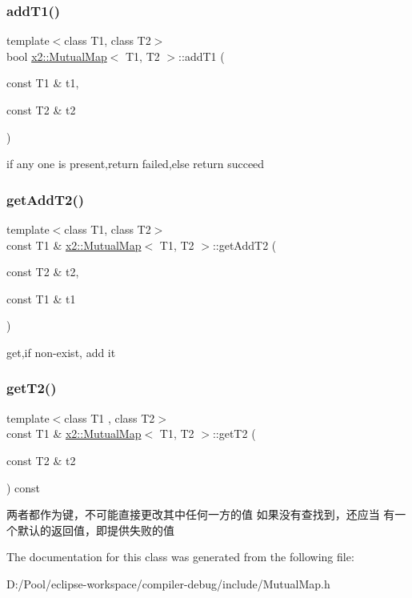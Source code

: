 \subsubsection{\texorpdfstring{add\+T1()}{addT1()}}
{\footnotesize\ttfamily template$<$class T1, class T2$>$ \\
bool \hyperlink{classx2_1_1_mutual_map}{x2\+::\+Mutual\+Map}$<$ T1, T2 $>$\+::add\+T1 (\begin{DoxyParamCaption}\item[{const T1 \&}]{t1,  }\item[{const T2 \&}]{t2 }\end{DoxyParamCaption})\hspace{0.3cm}{\ttfamily [inline]}}

if any one is present,return failed,else return succeed \mbox{\label{classx2_1_1_mutual_map_aba13a2fb8bd6343efc7874da48c5156c}} 
\subsubsection{\texorpdfstring{get\+Add\+T2()}{getAddT2()}}
{\footnotesize\ttfamily template$<$class T1, class T2$>$ \\
const T1 \& \hyperlink{classx2_1_1_mutual_map}{x2\+::\+Mutual\+Map}$<$ T1, T2 $>$\+::get\+Add\+T2 (\begin{DoxyParamCaption}\item[{const T2 \&}]{t2,  }\item[{const T1 \&}]{t1 }\end{DoxyParamCaption})\hspace{0.3cm}{\ttfamily [inline]}}

get,if non-\/exist, add it \mbox{\label{classx2_1_1_mutual_map_acff746e0227b363d23d7a854a9673d44}} 
\subsubsection{\texorpdfstring{get\+T2()}{getT2()}}
{\footnotesize\ttfamily template$<$class T1 , class T2$>$ \\
const T1 \& \hyperlink{classx2_1_1_mutual_map}{x2\+::\+Mutual\+Map}$<$ T1, T2 $>$\+::get\+T2 (\begin{DoxyParamCaption}\item[{const T2 \&}]{t2 }\end{DoxyParamCaption}) const\hspace{0.3cm}{\ttfamily [inline]}}

两者都作为键，不可能直接更改其中任何一方的值 如果没有查找到，还应当 有一个默认的返回值，即提供失败的值 

The documentation for this class was generated from the following file\+:\begin{DoxyCompactItemize}
\item 
D\+:/\+Pool/eclipse-\/workspace/compiler-\/debug/include/Mutual\+Map.\+h\end{DoxyCompactItemize}
